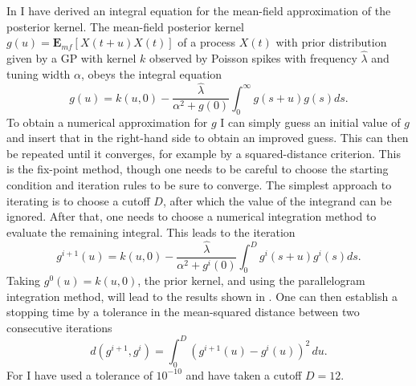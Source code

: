 In  I have derived an integral equation for the mean-field approximation of the posterior kernel. The mean-field posterior kernel  
$g(u) = \boldsymbol{E}_{mf}\left[X(t+u)X(t)\right]$ of 
a process $X(t)$ with prior distribution given by a GP with kernel $k$ observed by Poisson spikes with frequency $\hat{\lambda}$ and tuning width $\alpha$,
obeys the integral equation
\begin{equation*}
g(u) = k(u,0)  - \frac{\hat{\lambda}}{\alpha^2+ g(0)} \int_0^\infty g(s+u)g(s) ds.
\end{equation*}
To obtain a numerical approximation for $g$ I can simply guess an initial value of $g$ and insert that in the right-hand side to obtain an improved guess. This can then be repeated until
it converges, for example by a squared-distance criterion. This is the fix-point method,
though one needs to be careful to choose the starting condition and iteration rules to be sure to converge. The simplest approach to iterating  is to choose a 
cutoff $D$, after which the value of the integrand can be ignored. After that, one needs to choose a numerical integration method to evaluate the remaining integral. This leads to the
iteration
\[
g^{i+1}(u) = k(u,0)- \frac{\hat{\lambda}}{\alpha^2+ g^i(0)} \int_0^D g^i(s+u)g^i(s) ds.
\]
Taking $g^0(u) = k(u,0)$, the prior kernel, and using the parallelogram integration method, will lead to the results shown in .
One can then establish a stopping time by a tolerance in the mean-squared distance between two consecutive iterations
\[
d(g^{i+1},g^i) = \int_0^D (g^{i+1}(u)-g^i(u))^2\, du.
\]
For  I have used a tolerance of $10^{-10}$ and have taken a cutoff $D=12$.